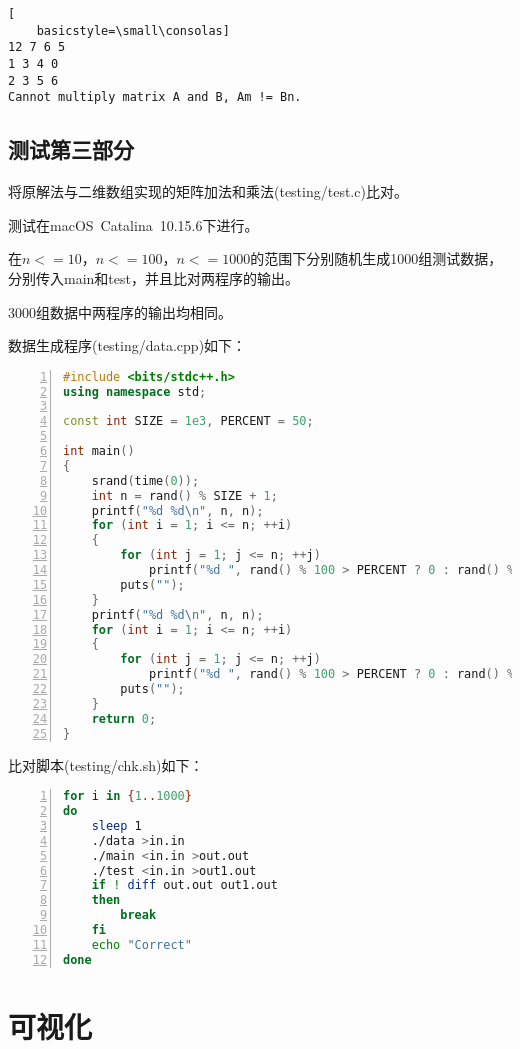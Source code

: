 \documentclass{article}
\begin{document}
\begin{lstlisting}[
    basicstyle=\small\consolas]
12 7 6 5 
1 3 4 0 
2 3 5 6 
Cannot multiply matrix A and B, Am != Bn.
\end{lstlisting}

\subsection{测试第三部分}

将原解法与二维数组实现的矩阵加法和乘法(testing/test.c)比对。

测试在macOS\ Catalina\ 10.15.6下进行。

在$n<=10$，$n<=100$，$n<=1000$的范围下分别随机生成1000组测试数据，分别传入main和test，并且比对两程序的输出。

3000组数据中两程序的输出均相同。

数据生成程序(testing/data.cpp)如下：

\begin{lstlisting}[language={C++},
    numbers=left,
    numberstyle=\tiny\consolas,
    basicstyle=\small\consolas]
#include <bits/stdc++.h>
using namespace std;

const int SIZE = 1e3, PERCENT = 50;

int main()
{
    srand(time(0));
    int n = rand() % SIZE + 1;
    printf("%d %d\n", n, n);
    for (int i = 1; i <= n; ++i)
    {
        for (int j = 1; j <= n; ++j)
            printf("%d ", rand() % 100 > PERCENT ? 0 : rand() % 1000 + 1);
        puts("");
    }
    printf("%d %d\n", n, n);
    for (int i = 1; i <= n; ++i)
    {
        for (int j = 1; j <= n; ++j)
            printf("%d ", rand() % 100 > PERCENT ? 0 : rand() % 1000 + 1);
        puts("");
    }
    return 0;
}
\end{lstlisting}

比对脚本(testing/chk.sh)如下：

\begin{lstlisting}[language={bash},
    numbers=left,
    numberstyle=\tiny\consolas,
    basicstyle=\small\consolas]
for i in {1..1000}
do
    sleep 1
    ./data >in.in
    ./main <in.in >out.out
    ./test <in.in >out1.out
    if ! diff out.out out1.out
    then
        break
    fi
    echo "Correct"
done
\end{lstlisting}

\section{可视化}
\end{document}
